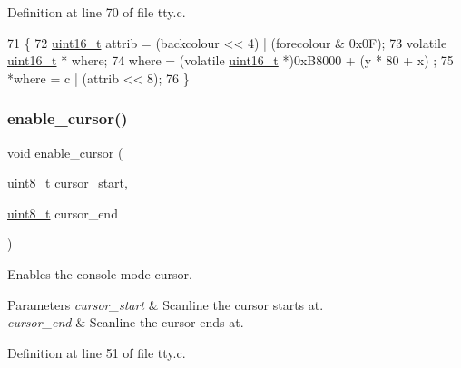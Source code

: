 Definition at line 70 of file tty.\+c.


\begin{DoxyCode}
71 \{
72      \hyperlink{a00140_a273cf69d639a59973b6019625df33e30_a273cf69d639a59973b6019625df33e30}{uint16\_t} attrib = (backcolour << 4) | (forecolour & 0x0F);
73      \textcolor{keyword}{volatile} \hyperlink{a00140_a273cf69d639a59973b6019625df33e30_a273cf69d639a59973b6019625df33e30}{uint16\_t} * where;
74      where = (\textcolor{keyword}{volatile} \hyperlink{a00140_a273cf69d639a59973b6019625df33e30_a273cf69d639a59973b6019625df33e30}{uint16\_t} *)0xB8000 + (y * 80 + x) ;
75      *where = c | (attrib << 8);
76 \}
\end{DoxyCode}
\mbox{\label{a00176_afe197dc4dbfa6036ef04abd2aeeeca2d_afe197dc4dbfa6036ef04abd2aeeeca2d}} 
\subsubsection{\texorpdfstring{enable\+\_\+cursor()}{enable\_cursor()}}
{\footnotesize\ttfamily void enable\+\_\+cursor (\begin{DoxyParamCaption}\item[{\hyperlink{a00140_aba7bc1797add20fe3efdf37ced1182c5_aba7bc1797add20fe3efdf37ced1182c5}{uint8\+\_\+t}}]{cursor\+\_\+start,  }\item[{\hyperlink{a00140_aba7bc1797add20fe3efdf37ced1182c5_aba7bc1797add20fe3efdf37ced1182c5}{uint8\+\_\+t}}]{cursor\+\_\+end }\end{DoxyParamCaption})}



Enables the console mode cursor. 


\begin{DoxyParams}{Parameters}
{\em cursor\+\_\+start} & Scanline the cursor starts at. \\
\hline
{\em cursor\+\_\+end} & Scanline the cursor ends at. \\
\hline
\end{DoxyParams}


Definition at line 51 of file tty.\+c.


